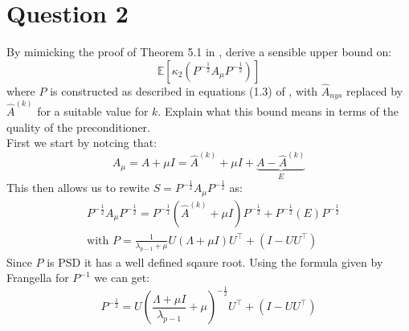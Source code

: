 \section{Question 2}
By mimicking the proof of Theorem 5.1 in \cite{frangella2021randomizednystrompreconditioning}, derive a sensible upper bound
on:
\begin{equation*}
    \mathds{E}\left[\kappa_2(P^{-\frac{1}{2}}A_{\mu}P^{-\frac{1}{2}})\right]
\end{equation*}
where $P$ is constructed as described in equations (1.3) of \cite{frangella2021randomizednystrompreconditioning}, with $\hat{A}_{nys}$
replaced by $\hat{A}^{(k)}$ for a suitable value for $k$. Explain what this bound means in terms of the quality of the
preconditioner. \\

First we start by notcing that:
\begin{equation*}
    A_{\mu} = A + \mu I = \hat{A}^{(k)} + \mu I + \underbrace{A - \hat{A}^{(k)}}_{E}
\end{equation*}
This then allows us to rewite $S = P^{-\frac{1}{2}}A_{\mu}P^{-\frac{1}{2}}$ as:
\begin{align*}
    &P^{-\frac{1}{2}}A_{\mu}P^{-\frac{1}{2}} = P^{-\frac{1}{1}}(\hat{A}^{(k)} + \mu I)P^{-\frac{1}{2}} + P^{-\frac{1}{2}}(E)P^{-\frac{1}{2}} \\
    & \text{with } P = \frac{1}{\lambda_{p-1} + \mu}U(\Lambda + \mu I)U^{\top} + (I-UU^{\top})
\end{align*}
Since $P$ is PSD it has a well defined sqaure root. Using the formula given by Frangella for $P^{-1}$ we can get:
\begin{equation*}
    P^{-\frac{1}{2}} = U(\frac{\Lambda + \mu I}{\lambda_{p-1}} + \mu)^{-\frac{1}{2}}U^{\top} + (I-UU^{\top})
\end{equation*} 


\newcommand{\preconditionFullForm}[1]{%
    \left[U\left(\frac{\Lambda+ \mu I}{\lambda_{p-1} + \mu}\right)^{-\frac{1}{2}}U^{\top} + (I-UU^{\top})\right] 
    #1 
    \left[U\left(\frac{\Lambda+ \mu I}{\lambda_{p-1} + \mu}\right)^{-\frac{1}{2}}U^{\top} + (I-UU^{\top})\right]%
}
\newcommand{\precondition}[1]{P^{-\frac{1}{2}} (#1) P^{-\frac{1}{2}} }

